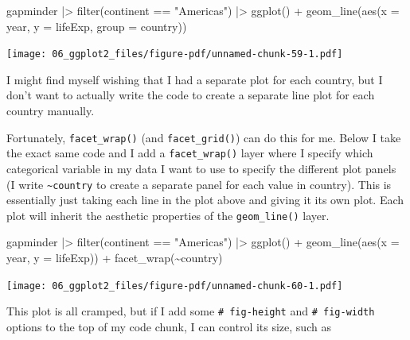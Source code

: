 \documentclass[
  letterpaper,
  DIV=11,
  numbers=noendperiod]{scrreprt}
\newenvironment{Shaded}{\begin{snugshade}}{\end{snugshade}}
\newcommand{\AttributeTok}[1]{\textcolor[rgb]{0.40,0.45,0.13}{#1}}
\newcommand{\FunctionTok}[1]{\textcolor[rgb]{0.28,0.35,0.67}{#1}}
\newcommand{\NormalTok}[1]{\textcolor[rgb]{0.00,0.23,0.31}{#1}}
\newcommand{\SpecialCharTok}[1]{\textcolor[rgb]{0.37,0.37,0.37}{#1}}
\newcommand{\StringTok}[1]{\textcolor[rgb]{0.13,0.47,0.30}{#1}}
\begin{document}
\begin{Shaded}
\begin{Highlighting}[]
\NormalTok{gapminder }\SpecialCharTok{|\textgreater{}}
  \FunctionTok{filter}\NormalTok{(continent }\SpecialCharTok{==} \StringTok{"Americas"}\NormalTok{) }\SpecialCharTok{|\textgreater{}}
  \FunctionTok{ggplot}\NormalTok{() }\SpecialCharTok{+} 
  \FunctionTok{geom\_line}\NormalTok{(}\FunctionTok{aes}\NormalTok{(}\AttributeTok{x =}\NormalTok{ year, }
                \AttributeTok{y =}\NormalTok{ lifeExp, }
                \AttributeTok{group =}\NormalTok{ country))}
\end{Highlighting}
\end{Shaded}

\texttt{[image: 06\_ggplot2\_files/figure-pdf/unnamed-chunk-59-1.pdf]}

I might find myself wishing that I had a separate plot for each country,
but I don't want to actually write the code to create a separate line
plot for each country manually.

Fortunately, \texttt{facet\_wrap()} (and \texttt{facet\_grid()}) can do
this for me. Below I take the exact same code and I add a
\texttt{facet\_wrap()} layer where I specify which categorical variable
in my data I want to use to specify the different plot panels (I write
\texttt{\textasciitilde{}country} to create a separate panel for each
value in country). This is essentially just taking each line in the plot
above and giving it its own plot. Each plot will inherit the aesthetic
properties of the \texttt{geom\_line()} layer.

\begin{Shaded}
\begin{Highlighting}[]
\NormalTok{gapminder }\SpecialCharTok{|\textgreater{}}
  \FunctionTok{filter}\NormalTok{(continent }\SpecialCharTok{==} \StringTok{"Americas"}\NormalTok{) }\SpecialCharTok{|\textgreater{}}
  \FunctionTok{ggplot}\NormalTok{() }\SpecialCharTok{+} 
  \FunctionTok{geom\_line}\NormalTok{(}\FunctionTok{aes}\NormalTok{(}\AttributeTok{x =}\NormalTok{ year, }
                \AttributeTok{y =}\NormalTok{ lifeExp)) }\SpecialCharTok{+}
  \FunctionTok{facet\_wrap}\NormalTok{(}\SpecialCharTok{\textasciitilde{}}\NormalTok{country)}
\end{Highlighting}
\end{Shaded}

\texttt{[image: 06\_ggplot2\_files/figure-pdf/unnamed-chunk-60-1.pdf]}

This plot is all cramped, but if I add some
\texttt{\#\textbar{}\ fig-height} and \texttt{\#\textbar{}\ fig-width}
options to the top of my code chunk, I can control its size, such as
\end{document}

